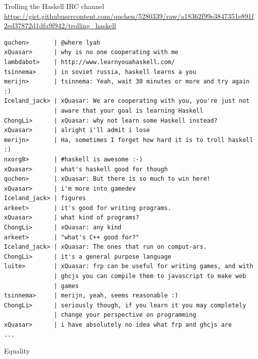 \documentclass[8pt]{beamer}
\begin{document}
\begin{frame}[fragile]{Trolling the Haskell IRC channel}
{\tiny \url{https://gist.githubusercontent.com/quchen/5280339/raw/a18362f99e3847351e891f2ed37872d1dfa9f942/trolling_haskell}}
{\tiny
\begin{verbatim}
quchen>       | @where lyah
xQuasar>      | why is no one cooperating with me
lambdabot>    | http://www.learnyouahaskell.com/
tsinnema>     | in soviet russia, haskell learns a you
merijn>       | tsinnema: Yeah, wait 30 minutes or more and try again :)
Iceland_jack> | xQuasar: We are cooperating with you, you're just not 
              | aware that your goal is learning Haskell
ChongLi>      | xQuasar: why not learn some Haskell instead?
xQuasar>      | alright i'll admit i lose
merijn>       | Ha, sometimes I forget how hard it is to troll haskell :)
nxorg8>       | #haskell is awesome :-)
xQuasar>      | what's haskell good for though
quchen>       | xQuasar: But there is so much to win here!
xQuasar>      | i'm more into gamedev
Iceland_jack> | figures
arkeet>       | it's good for writing programs.
xQuasar>      | what kind of programs?
ChongLi>      | xQuasar: any kind
arkeet>       | "what's C++ good for?"
Iceland_jack> | xQuasar: The ones that run on comput-ars.
ChongLi>      | it's a general purpose language
luite>        | xQuasar: frp can be useful for writing games, and with 
              | ghcjs you can compile them to javascript to make web 
              | games
tsinnema>     | merijn, yeah, seems reasonable :)
ChongLi>      | seriously though, if you learn it you may completely 
              | change your perspective on programming
xQuasar>      | i have absolutely no idea what frp and ghcjs are
...
\end{verbatim}
}
\end{frame}


\begin{frame}{Equality}
\end{frame}
\end{document}
